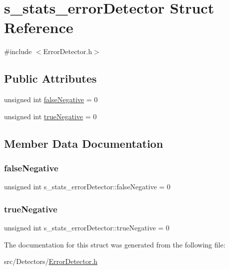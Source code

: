 \hypertarget{structs__stats__error_detector}{}\section{s\+\_\+stats\+\_\+error\+Detector Struct Reference}
\label{structs__stats__error_detector}


{\ttfamily \#include $<$Error\+Detector.\+h$>$}

\subsection*{Public Attributes}
\begin{DoxyCompactItemize}
\item 
unsigned int \hyperlink{structs__stats__error_detector_a612288d77cf4bd7c6244474fb738768d}{false\+Negative} = 0
\item 
unsigned int \hyperlink{structs__stats__error_detector_ad37aeef79761af921bb44f31024c78ce}{true\+Negative} = 0
\end{DoxyCompactItemize}


\subsection{Member Data Documentation}
\mbox{\label{structs__stats__error_detector_a612288d77cf4bd7c6244474fb738768d}} 
\subsubsection{\texorpdfstring{false\+Negative}{falseNegative}}
{\footnotesize\ttfamily unsigned int s\+\_\+stats\+\_\+error\+Detector\+::false\+Negative = 0}

\mbox{\label{structs__stats__error_detector_ad37aeef79761af921bb44f31024c78ce}} 
\subsubsection{\texorpdfstring{true\+Negative}{trueNegative}}
{\footnotesize\ttfamily unsigned int s\+\_\+stats\+\_\+error\+Detector\+::true\+Negative = 0}



The documentation for this struct was generated from the following file\+:\begin{DoxyCompactItemize}
\item 
src/\+Detectors/\hyperlink{_error_detector_8h}{Error\+Detector.\+h}\end{DoxyCompactItemize}
